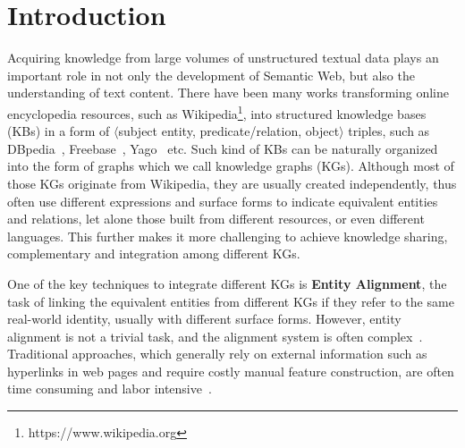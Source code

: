 	
	\section{Introduction}
	\label{section:intro}
	Acquiring knowledge from large volumes of unstructured textual data plays an important role in not only the development of Semantic Web, but also the understanding of text content. There have been many works transforming online encyclopedia resources, such as Wikipedia\footnote{https://www.wikipedia.org}, into structured knowledge bases (KBs) in a form of $\langle$subject entity, predicate/relation, object$\rangle$ triples, such as DBpedia~\cite{Lehmann2009DBpedia,Auer2007DBpedia}, Freebase~\cite{Bollacker2007Freebase}, Yago~\cite{Suchanek2008YAGO} etc. 
	Such kind of KBs can be naturally organized into the form of graphs which we call knowledge graphs (KGs). Although most of those KGs originate from Wikipedia, they are usually created independently, thus often use different expressions and surface forms to indicate equivalent entities and relations, let alone those built from different resources, or even different languages. This further makes it more challenging to achieve knowledge sharing, complementary and integration among different KGs.
	
	One of the key techniques to integrate different KGs is \textbf{Entity Alignment}, the task of linking the equivalent entities from different KGs if they refer to the same real-world identity, usually with different surface forms. However, entity alignment is not a trivial task, and the alignment system is often complex~\cite{gokhale2014corleone,scharffe2014ontology}. Traditional approaches, which generally rely on external information such as hyperlinks in web pages and require costly manual feature construction, are often time consuming and labor intensive~\cite{zhu2017iterative}. 
	
